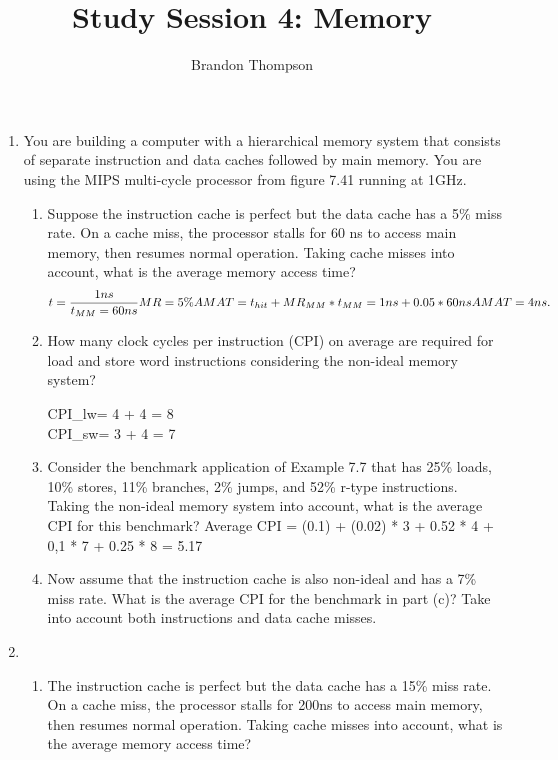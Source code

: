 \documentclass[a4paper]{article}
\begin{document}
	\title{Study Session 4: Memory}
	\author{Brandon Thompson}
	\maketitle
	
	\begin{enumerate}

		\item You are building a computer with a hierarchical memory system that consists
			of separate instruction
	and data caches followed by main memory. You are using the MIPS multi-cycle processor from figure 7.41
	running at 1GHz.
	\begin{enumerate}
		\item Suppose the instruction cache is perfect but the data cache has a 5\% miss rate. On a
			cache miss, the processor stalls for 60 ns to access main memory, then resumes normal
			operation. Taking cache misses into account, what is the average memory access time?
			\[
			t=\frac{1ns}{t_{MM}=60ns} MR=5\%\\
			AMAT = t_{hit} + MR_{MM} * t_{MM}\\
			=1ns + 0.05 * 60ns\\
			AMAT = 4ns
			.\] 
		\item How many clock cycles per instruction (CPI) on average are required for load and store
			word instructions considering the non-ideal memory system?

			CPI_{lw}= 4 + 4 = 8\\
			CPI_{sw}= 3 + 4 = 7
		\item Consider the benchmark application of Example 7.7 that has 25\% loads, 10\% stores, 11\%
			branches, 2\% jumps, and 52\% r-type instructions. Taking the non-ideal memory system
			into account, what is the average CPI for this benchmark?
			Average CPI =
			(0.1) + (0.02) * 3 + 0.52 * 4 + 0,1 * 7 + 0.25 * 8 = 5.17

		\item Now assume that the instruction cache is also non-ideal and has a 7\% miss rate. What
			is the average CPI for the benchmark in part (c)? Take into account both instructions
			and data cache misses.
	\end{enumerate}

		\item 
			\begin{enumerate}
				\item The instruction cache is perfect but the data cache has a 15\% miss
					rate. On a cache miss, the processor stalls for 200ns to access
					main memory, then resumes normal operation. Taking cache misses into
					account, what is the average memory access time?


\end{enumerate}
\end{enumerate}
\end{document}
